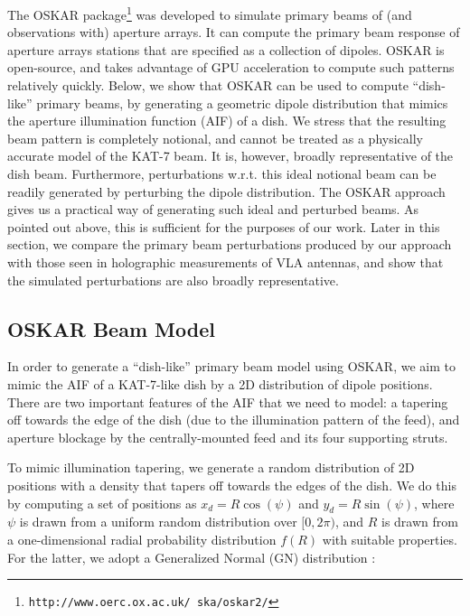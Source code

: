\documentclass[fleqn,usenatbib]{mnras}
\begin{document}
The OSKAR package\footnote{{\tt http://www.oerc.ox.ac.uk/~ska/oskar2/}} \citep{2017MNRAS.465.3680M,2014arXiv1408.3998S,2009wska.confE..31D}  was developed to simulate primary beams of (and observations with) aperture arrays. It can compute the primary beam response of aperture arrays stations that are specified as a collection of dipoles. OSKAR is open-source, and takes advantage of GPU acceleration to compute such patterns relatively quickly. Below, we show that OSKAR can be used to compute ``dish-like'' primary beams, by generating a geometric dipole distribution that mimics the aperture illumination function (AIF) of a dish. We stress that the resulting beam pattern is completely notional, and cannot be treated as a physically accurate model of the KAT-7 beam. It is, however, broadly representative of the dish beam. Furthermore, perturbations
w.r.t. this ideal notional beam can be readily generated by perturbing the dipole distribution. The OSKAR approach gives us a practical way of generating such ideal and perturbed beams. As pointed out above, this is sufficient for the purposes of our work. Later in this section, we compare the primary beam perturbations produced by our approach with those seen in holographic measurements of VLA antennas, and show that the simulated perturbations are also broadly representative.



\subsection{OSKAR Beam Model}		\label{sec:oskar-bm}
In order to generate a ``dish-like'' primary beam model using OSKAR, we aim to mimic the AIF of a KAT-7-like dish by a 2D distribution of dipole positions. There are two important features of the AIF that we need to model: a tapering off towards the edge of the dish (due to the illumination pattern of the feed), and aperture blockage by the centrally-mounted feed and its four supporting struts.  

To mimic illumination tapering, we generate a random distribution of 2D positions with a density that tapers off towards the edges of the dish. We do this by computing a set of positions as $x_d = R\cos(\psi)$ and $y_d = R\sin(\psi)$, where $\psi$ is drawn from a uniform random distribution over $[0, 2\pi)$, and $R$ is drawn from a 
one-dimensional radial probability distribution $f(R)$ with suitable properties. For the latter, we adopt a Generalized Normal (GN) distribution 
\citep{techreport-minimal,techreport-minimal2}:
\end{document}
